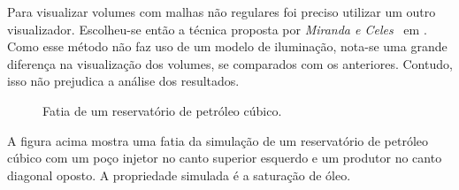 	Para visualizar volumes com malhas não regulares foi preciso utilizar um outro visualizador. Escolheu-se então a técnica proposta por \textit{Miranda e Celes}~\cite{miranda} em . Como esse método não faz uso de um modelo de iluminação, nota-se uma grande diferença na visualização dos volumes, se comparados com os anteriores. Contudo, isso não prejudica a análise dos resultados.
	
\begin{figure}[h]
	\centering
	\caption{Fatia de um reservatório de petróleo cúbico.}
	\label{fig:box_slice}
\end{figure}

	A figura acima mostra uma fatia da simulação de um reservatório de petróleo cúbico com um poço injetor no canto superior esquerdo e um produtor no canto diagonal oposto. A propriedade simulada é a saturação de óleo.

